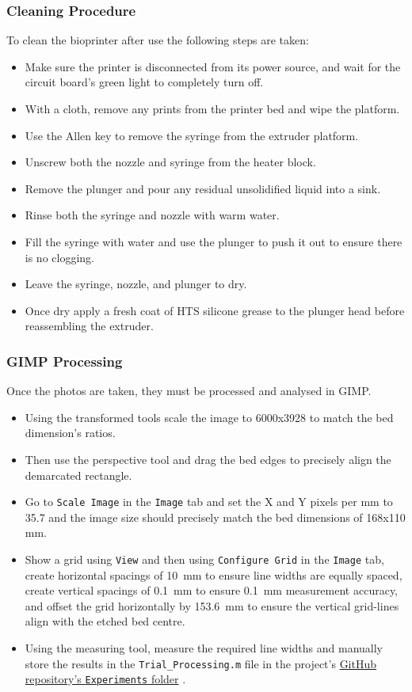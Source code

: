 \subsubsection*{Cleaning Procedure}
To clean the bioprinter after use the following steps are taken:
\begin{itemize}
    \item Make sure the printer is disconnected from its power source, and wait for the circuit board's green light to completely turn off.
    \item With a cloth, remove any prints from the printer bed and wipe the platform.
    \item Use the Allen key to remove the syringe from the extruder platform.
    \item Unscrew both the nozzle and syringe from the heater block.
    \item Remove the plunger and pour any residual unsolidified liquid into a sink.
    \item Rinse both the syringe and nozzle with warm water.
    \item Fill the syringe with water and use the plunger to push it out to ensure there is no clogging.
    \item Leave the syringe, nozzle, and plunger to dry.
    \item Once dry apply a fresh coat of HTS silicone grease to the plunger head before reassembling the extruder.
\end{itemize}
\subsubsection*{GIMP Processing}
Once the photos are taken, they must be processed and analysed in GIMP. 
\begin{itemize}
    \item Using the transformed tools scale the image to 6000x3928 to match the bed dimension's ratios.
    \item Then use the perspective tool and drag the bed edges to precisely align the demarcated rectangle.
    \item Go to \texttt{Scale Image} in the \texttt{Image} tab and set the X and Y pixels per mm to 35.7 and the image size should precisely match the bed dimensions of 168x110 mm.
    \item Show a grid using \texttt{View} and then using \texttt{Configure Grid} in the \texttt{Image} tab, create horizontal spacings of 10~mm to ensure line widths are equally spaced, create vertical spacings of 0.1~mm to ensure 0.1~mm measurement accuracy, and offset the grid horizontally by 153.6~mm to ensure the vertical grid-lines align with the etched bed centre.
    \item Using the measuring tool, measure the required line widths and manually store the results in the \texttt{Trial\_Processing.m} file in the project’s \href{https://github.com/SimonDaniel605/Hydrogel-3D-Printer/tree/main/Experiments}{GitHub repository's \texttt{Experiments} folder} \citep{Daniel2025_HydrogelPrinter}.
\end{itemize}
